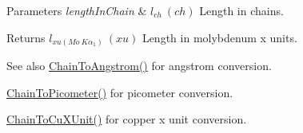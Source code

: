 \begin{DoxyParams}{Parameters}
{\em length\+In\+Chain} & $ l_{ch}\ (ch)$ Length in chains. \\
\hline
\end{DoxyParams}
\begin{DoxyReturn}{Returns}
$ l_{xu(Mo\ K\alpha_1)}\ (xu)$ Length in molybdenum x units. 
\end{DoxyReturn}
\begin{DoxySeeAlso}{See also}
\mbox{\hyperlink{group___e_g_x_math-_conversions-_length_conversions-_surveyors-_chain-_non-_s_i_ga89e870762310908510aad80d26dc1942}{Chain\+To\+Angstrom()}} for angstrom conversion. 

\mbox{\hyperlink{group___e_g_x_math-_conversions-_length_conversions-_surveyors-_chain-_s_i_ga27f06f3f63727a16e02afaf8f01f4b45}{Chain\+To\+Picometer()}} for picometer conversion. 

\mbox{\hyperlink{group___e_g_x_math-_conversions-_length_conversions-_surveyors-_chain-_non-_s_i_ga4d49e29ef32b64b7a433ffe76447cf5f}{Chain\+To\+Cu\+X\+Unit()}} for copper x unit conversion. 
\end{DoxySeeAlso}
